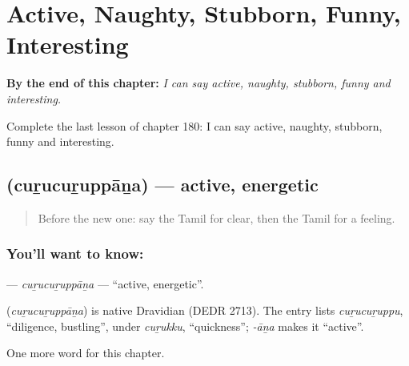 
\chapter{Active, Naughty, Stubborn, Funny, Interesting}
\label{ch:ta-active-naughty-stubborn-funny-interesting}

\begin{chapteropening}
\textbf{By the end of this chapter:} \emph{I can say active, naughty, stubborn, funny and interesting.}

Complete the last lesson of chapter 180: I can say active, naughty, stubborn, funny and interesting.
\end{chapteropening}

\section[\texorpdfstring{\ta{சுறுசுறுப்பான} (cuṟucuṟuppāṉa)}{சுறுசுறுப்பான (cuṟucuṟuppāṉa)}]{ (cuṟucuṟuppāṉa) — active, energetic}

\label{lesson:TA-C180-curucuruppana}



\begin{quote}
Before the new one: say the Tamil for clear, then the Tamil for a feeling.
\end{quote}

\subsection*{You'll want to know: }
\textbf{} — \emph{cuṟucuṟuppāṉa} — \textquotedblleft{}active, energetic\textquotedblright{}.

\begin{cousinweb}
\textbf{} (\emph{cuṟucuṟuppāṉa}) is native Dravidian (DEDR 2713). The entry lists \emph{cuṟucuṟuppu}, \textquotedblleft{}diligence, bustling\textquotedblright{}, under \emph{cuṟukku}, \textquotedblleft{}quickness\textquotedblright{}; \emph{-āṉa} makes it \textquotedblleft{}active\textquotedblright{}.
\end{cousinweb}

\begin{grammarlens}[title={What you've built}]
One more word for this chapter.
\end{grammarlens}

